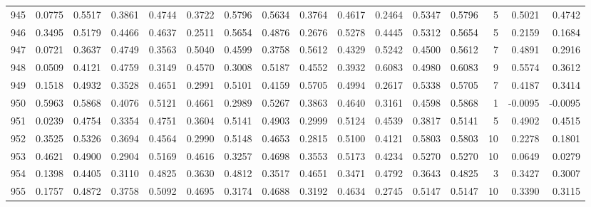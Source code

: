 \begin{tabular}{lrrrrrrrrrrrrrrr}
945 &      0.0775 &  0.5517 &  0.3861 &  0.4744 &  0.3722 &  0.5796 &  0.5634 &  0.3764 &  0.4617 &  0.2464 &   0.5347 &     0.5796 &      5 &                    0.5021 &                     0.4742 \\
946 &      0.3495 &  0.5179 &  0.4466 &  0.4637 &  0.2511 &  0.5654 &  0.4876 &  0.2676 &  0.5278 &  0.4445 &   0.5312 &     0.5654 &      5 &                    0.2159 &                     0.1684 \\
947 &      0.0721 &  0.3637 &  0.4749 &  0.3563 &  0.5040 &  0.4599 &  0.3758 &  0.5612 &  0.4329 &  0.5242 &   0.4500 &     0.5612 &      7 &                    0.4891 &                     0.2916 \\
948 &      0.0509 &  0.4121 &  0.4759 &  0.3149 &  0.4570 &  0.3008 &  0.5187 &  0.4552 &  0.3932 &  0.6083 &   0.4980 &     0.6083 &      9 &                    0.5574 &                     0.3612 \\
949 &      0.1518 &  0.4932 &  0.3528 &  0.4651 &  0.2991 &  0.5101 &  0.4159 &  0.5705 &  0.4994 &  0.2617 &   0.5338 &     0.5705 &      7 &                    0.4187 &                     0.3414 \\
950 &      0.5963 &  0.5868 &  0.4076 &  0.5121 &  0.4661 &  0.2989 &  0.5267 &  0.3863 &  0.4640 &  0.3161 &   0.4598 &     0.5868 &      1 &                   -0.0095 &                    -0.0095 \\
951 &      0.0239 &  0.4754 &  0.3354 &  0.4751 &  0.3604 &  0.5141 &  0.4903 &  0.2999 &  0.5124 &  0.4539 &   0.3817 &     0.5141 &      5 &                    0.4902 &                     0.4515 \\
952 &      0.3525 &  0.5326 &  0.3694 &  0.4564 &  0.2990 &  0.5148 &  0.4653 &  0.2815 &  0.5100 &  0.4121 &   0.5803 &     0.5803 &     10 &                    0.2278 &                     0.1801 \\
953 &      0.4621 &  0.4900 &  0.2904 &  0.5169 &  0.4616 &  0.3257 &  0.4698 &  0.3553 &  0.5173 &  0.4234 &   0.5270 &     0.5270 &     10 &                    0.0649 &                     0.0279 \\
954 &      0.1398 &  0.4405 &  0.3110 &  0.4825 &  0.3630 &  0.4812 &  0.3517 &  0.4651 &  0.3471 &  0.4792 &   0.3643 &     0.4825 &      3 &                    0.3427 &                     0.3007 \\
955 &      0.1757 &  0.4872 &  0.3758 &  0.5092 &  0.4695 &  0.3174 &  0.4688 &  0.3192 &  0.4634 &  0.2745 &   0.5147 &     0.5147 &     10 &                    0.3390 &                     0.3115 \\

\end{tabular}
